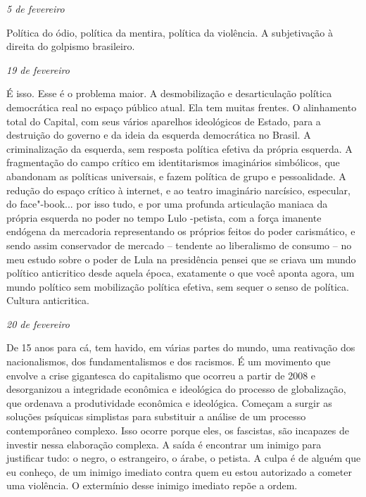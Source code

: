\begin{flushright}
\emph{5 de fevereiro}
\end{flushright}

Política do ódio, política da mentira, política da violência. A
subjetivação à direita do golpismo brasileiro.

\begin{flushright}
\emph{19 de fevereiro}
\end{flushright}

É isso. Esse é o problema maior. A desmobilização e desarticulação
política democrática real no espaço público atual. Ela tem muitas
frentes. O alinhamento total do Capital, com seus vários aparelhos
ideológicos de Estado, para a destruição do governo e da ideia da
esquerda democrática no Brasil. A criminalização da esquerda, sem
resposta política efetiva da própria esquerda. A fragmentação do campo
crítico em identitarismos imaginários simbólicos, que abandonam as
políticas universais, e fazem política de grupo e pessoalidade. A
redução do espaço crítico à internet, e ao teatro imaginário narcísico,
especular, do face"-book... por isso tudo, e por uma profunda articulação
maniaca da própria esquerda no poder no tempo Lulo -petista, com a força
imanente endógena da mercadoria representando os próprios feitos do
poder carismático, e sendo assim conservador de mercado -- tendente ao
liberalismo de consumo -- no meu estudo sobre o poder de Lula na
presidência pensei que se criava um mundo político anticritico desde
aquela época, exatamente o que você aponta agora, um mundo político sem
mobilização política efetiva, sem sequer o senso de política. Cultura
anticritica.

\begin{flushright}
\emph{20 de fevereiro}
\end{flushright}

De 15 anos para cá, tem havido, em várias partes do mundo, uma
reativação dos nacionalismos, dos fundamentalismos e dos racismos. É um
movimento que envolve a crise gigantesca do capitalismo que ocorreu a
partir de 2008 e desorganizou a integridade econômica e ideológica do
processo de globalização, que ordenava a produtividade econômica e
ideológica. Começam a surgir as soluções psíquicas simplistas para
substituir a análise de um processo contemporâneo complexo. Isso ocorre
porque eles, os fascistas, são incapazes de investir nessa elaboração
complexa. A saída é encontrar um inimigo para justificar tudo: o negro,
o estrangeiro, o árabe, o petista. A culpa é de alguém que eu conheço,
de um inimigo imediato contra quem eu estou autorizado a cometer uma
violência. O extermínio desse inimigo imediato repõe a ordem.

